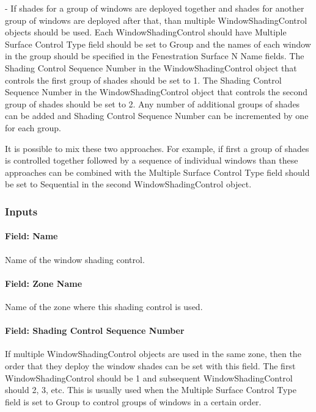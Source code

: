 - If shades for a group of windows are deployed together and shades for another group of windows are deployed after that, than multiple WindowShadingControl objects should be used. Each WindowShadingControl should have Multiple Surface Control Type field should be set to Group and the names of each window in the group should be specified in the Fenestration Surface N Name fields. The Shading Control Sequence Number in the  WindowShadingControl object that controls the first group of shades should be set to 1. The Shading Control Sequence Number in the  WindowShadingControl object that controls the second group of shades should be set to 2. Any number of additional groups of shades can be added and Shading Control Sequence Number can be incremented by one for each group.

It is possible to mix these two approaches. For example, if first a group of shades is controlled together followed by a sequence of individual windows than these approaches can be combined with the Multiple Surface Control Type field should be set to Sequential in the second WindowShadingControl object.

\subsubsection{Inputs}\label{inputs-32-001}

\paragraph{Field: Name}\label{field-name-29-001}

Name of the window shading control.

\paragraph{Field: Zone Name}\label{field-zone-name-29-001}

Name of the zone where this shading control is used.

\paragraph{Field: Shading Control Sequence Number}\label{shading-control-sequence-number}

If multiple WindowShadingControl objects are used in the same zone, then the order that they deploy the window shades can be set with this field. The first WindowShadingControl should be 1 and subsequent WindowShadingControl should 2, 3, etc. This is usually used when the Multiple Surface Control Type field is set to Group to control groups of windows in a certain order.

